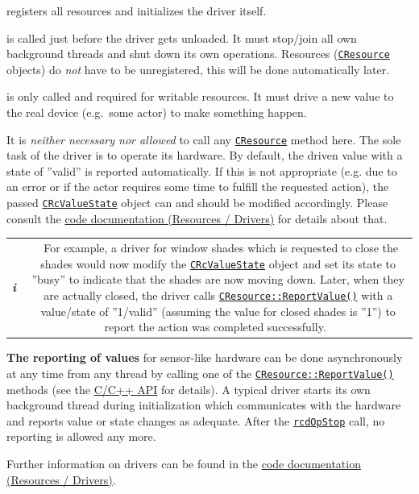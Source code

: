 \documentclass[12pt,english,parskip=half,headheight=19pt]{scrreprt}
\renewenvironment{description}[1][8ex]
  {\list{}{\labelwidth=5ex \leftmargin=#1 \let\makelabel\descriptionlabel}}
  {\endlist}
\newcommand{\infobox}[1]{
  \par
  \medskip
  \hfill
  \setlength\arrayrulewidth{1pt}
  \begin{tabular}[t]{c|c|}
    \parbox{1.8em}{\hfill\textit{\Huge\textbf{i}\,}}
    &
    \,\parbox{0.89\linewidth}{\setlength{\parskip}{0.5em} \small #1}\,
  \end{tabular}
  \medskip
  \par
}
\newcommand{\refdoc}[2]{\href{#1}{#2}}              %
\newcommand{\refapic}[1]{\href{home2l-api_c/index.html}{\mbox{\texttt{#1}}}}            %
\newcommand{\refapicgroup}[2]{\href{home2l-api_c/group__#1.html}{#2}}
\newcommand{\theapic}{\refdoc{home2l-api_c/index.html}{C/C++ API}}
\begin{document}
\begin{description}

\item[The ''Init'' operation]
  registers all resources and initializes the driver itself.

\item[The ''Stop'' operation]
  is called just before the driver gets unloaded. It must stop/join all own background
  threads and shut down its own operations.
  Resources (\refapic{CResource} objects) do \textit{not} have to be unregistered,
  this will be done automatically later.

\item[The ''DriveValue'' operation]
  is only called and required for writable resources. It must drive a new value
  to the real device (e.g.~some actor) to make something happen.

  It is \textit{neither necessary nor allowed} to call any \refapic{CResource} method here.
  The sole task of the driver is to operate its hardware. By default, the driven value with
  a state of ''valid'' is reported automatically. If this is not appropriate
  (e.g. due to an error or if the actor requires some time to fulfill the requested action),
  the passed \refapic{CRcValueState} object can and should be modified accordingly.
  Please consult the \refapicgroup{resources__drivers}{code documentation (Resources / Drivers)}
  for details about that.

  \infobox{
    For example, a driver for window shades which is requested to close the shades
    would now modify the \refapic{CRcValueState} object and set its state to ''busy'' to indicate
    that the shades are now moving down.
    Later, when they are actually closed, the driver calls \refapic{CResource::ReportValue()}
    with a value/state of ''1/valid'' (assuming the value for closed shades is ''1'')
    to report the action was completed successfully.
  }

\end{description}

\textbf{The reporting of values} for sensor-like hardware can be done asynchronously at any time from any thread by calling one of the \refapic{CResource::ReportValue()} methods (see the \theapic{} for details).
A typical driver starts its own background thread during initialization which communicates with the hardware and reports value or state changes as adequate. After the \refapic{rcdOpStop} call, no reporting is allowed any more.

Further information on drivers can be found in the \refapicgroup{resources__drivers}{code documentation (Resources / Drivers)}.
\end{document}
